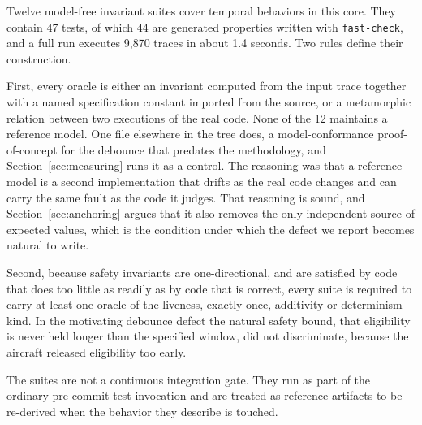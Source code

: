 \documentclass[12pt]{article}
\begin{document}
Twelve model-free invariant suites cover temporal behaviors in this core. They
contain 47 tests, of which 44 are generated properties written with
\texttt{fast-check}, and a full run executes 9{,}870 traces in about 1.4 seconds.
Two rules define their construction.

First, every oracle is either an invariant computed from the input trace together
with a named specification constant imported from the source, or a metamorphic
relation between two executions of the real code. None of the 12 maintains a
reference model. One file elsewhere in the tree does, a model-conformance
proof-of-concept for the debounce that predates the methodology, and
Section~\ref{sec:measuring} runs it as a control. The reasoning was that a reference model is a second implementation
that drifts as the real code changes and can carry the same fault as the code it
judges. That reasoning is sound, and Section~\ref{sec:anchoring} argues that it also
removes the only independent source of expected values, which is the condition under
which the defect we report becomes natural to write.

Second, because safety invariants are one-directional, and are satisfied by code
that does too little as readily as by code that is correct, every suite is
required to carry at least one oracle of the liveness, exactly-once, additivity
or determinism kind. In the motivating debounce defect the natural safety bound,
that eligibility is never held longer than the specified window, did not
discriminate, because the aircraft released eligibility too early.

The suites are not a continuous integration gate. They run as part of the
ordinary pre-commit test invocation and are treated as reference artifacts to be
re-derived when the behavior they describe is touched.
\end{document}
